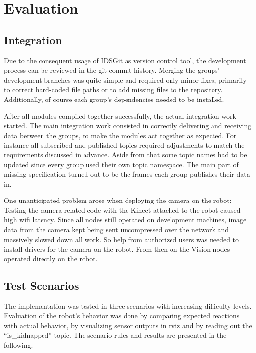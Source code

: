 \chapter{Evaluation}
\section{Integration}
Due to the consequent usage of IDSGit as version control tool, the development process can be reviewed in the git commit history. Merging the groups' development branches was quite simple and required only minor fixes, primarily to correct hard-coded file paths or to add missing files to the repository. Additionally, of course each group's dependencies needed to be installed.

After all modules compiled together successfully, the actual integration work started. The main integration work consisted in correctly delivering and receiving data between the groups, to make the modules act together as expected. For instance all subscribed and published topics required adjustments to match the requirements discussed in advance. Aside from that some topic names had to be updated since every group used their own topic namespace. The main part of missing specification turned out to be the frames each group publishes their data in.

One unanticipated problem arose when deploying the camera on the robot: Testing the camera related code with the Kinect attached to the robot caused high wifi latency. Since all nodes still operated on development machines, image data from the camera kept being sent uncompressed over the network and massively slowed down all work. So help from authorized users was needed to install drivers for the camera on the robot. From then on the Vision nodes operated directly on the robot.

\section{Test Scenarios}
The implementation was tested in three scenarios with increasing difficulty levels. Evaluation of the robot's behavior was done by comparing expected reactions with actual behavior, by visualizing sensor outputs in rviz and by reading out the ``is\_kidnapped'' topic. The scenario rules and results are presented in the following.

